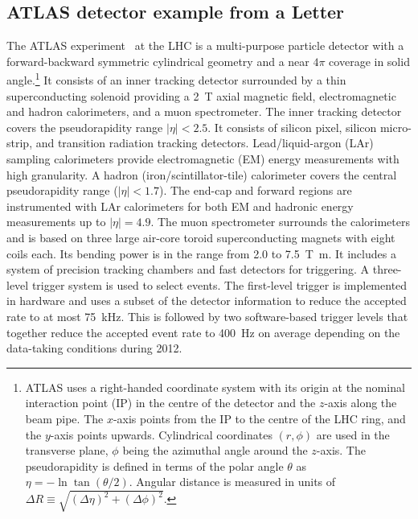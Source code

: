 \newcommand{\AtlasCoordFootnote}{%
ATLAS uses a right-handed coordinate system with its origin at the nominal interaction point (IP)
in the centre of the detector and the $z$-axis along the beam pipe.
The $x$-axis points from the IP to the centre of the LHC ring,
and the $y$-axis points upwards.
Cylindrical coordinates $(r,\phi)$ are used in the transverse plane, 
$\phi$ being the azimuthal angle around the $z$-axis.
The pseudorapidity is defined in terms of the polar angle $\theta$ as $\eta = -\ln \tan(\theta/2)$.
Angular distance is measured in units of $\Delta R \equiv \sqrt{(\Delta\eta)^{2} + (\Delta\phi)^{2}}$.}

\subsection{ATLAS detector example from a Letter}
\label{sec:atlas1}

The ATLAS experiment~\cite{PERF-2007-01} at the LHC is a multi-purpose particle detector
with a forward-backward symmetric cylindrical geometry and a near $4\pi$ coverage in 
solid angle.\footnote{\AtlasCoordFootnote}
It consists of an inner tracking detector surrounded by a thin superconducting solenoid
providing a \SI{2}{\tesla} axial magnetic field, electromagnetic and hadron calorimeters, and a muon spectrometer.
The inner tracking detector covers the pseudorapidity range $|\eta| < 2.5$.
It consists of silicon pixel, silicon micro-strip, and transition radiation tracking detectors.
Lead/liquid-argon (LAr) sampling calorimeters provide electromagnetic (EM) energy measurements
with high granularity.
A hadron (iron/scintillator-tile) calorimeter covers the central pseudorapidity range ($|\eta| < 1.7$).
The end-cap and forward regions are instrumented with LAr calorimeters
for both EM and hadronic energy measurements up to $|\eta| = 4.9$.
The muon spectrometer surrounds the calorimeters and is based on
three large air-core toroid superconducting magnets with eight coils each.
Its bending power is in the range from \num{2.0} to \SI{7.5}{\tesla\metre}.
It includes a system of precision tracking chambers and fast detectors for triggering.
A three-level trigger system is used to select events.
The first-level trigger is implemented in hardware and uses a subset of the detector information
to reduce the accepted rate to at most \SI{75}{\kilo\hertz}.
This is followed by two software-based trigger levels that
together reduce the accepted event rate to \SI{400}{\hertz} on average
depending on the data-taking conditions during 2012.


